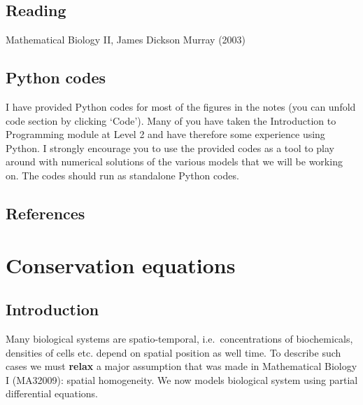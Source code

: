 \documentclass[
  letterpaper,
  DIV=11,
  numbers=noendperiod]{scrreprt}
\theoremstyle{definition}
\theoremstyle{plain}
\theoremstyle{plain}
\theoremstyle{remark}
\begin{document}
\hypertarget{reading}{%
\section*{Reading}\label{reading}}


Mathematical Biology II, James Dickson Murray (2003)

\hypertarget{python-codes}{%
\section*{Python codes}\label{python-codes}}


I have provided Python codes for most of the figures in the notes (you
can unfold code section by clicking `Code'). Many of you have taken the
Introduction to Programming module at Level 2 and have therefore some
experience using Python. I strongly encourage you to use the provided
codes as a tool to play around with numerical solutions of the various
models that we will be working on. The codes should run as standalone
Python codes.

\hypertarget{references}{%
\section*{References}\label{references}}



\hypertarget{conservation-equations}{%
\chapter{Conservation equations}\label{conservation-equations}}

\hypertarget{sec-conservation}{%
\section{Introduction}\label{sec-conservation}}

Many biological systems are spatio-temporal, i.e.~concentrations of
biochemicals, densities of cells etc. depend on spatial position as well
time. To describe such cases we must \textbf{relax} a major assumption
that was made in Mathematical Biology I (MA32009): spatial homogeneity.
We now models biological system using partial differential equations.
\end{document}
